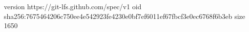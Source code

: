 version https://git-lfs.github.com/spec/v1
oid sha256:7675464206c750ee4e542923fe4230e0bf7ef6011ef67fbcf3e0ec6768f6b3eb
size 1650
